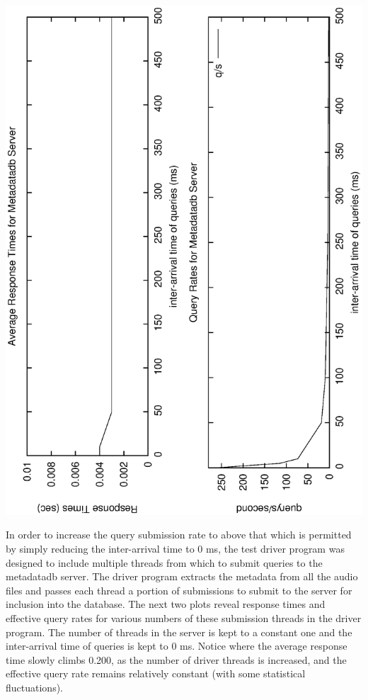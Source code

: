 \documentclass[11pt, a4paper]{article}
\begin{document}
\includegraphics[angle=-90,width=\linewidth]{mdperfthruput.eps}

In order to increase the query submission rate to above that which is permitted by simply 
reducing the inter-arrival time to 0 ms, the test driver program was designed to include multiple
threads from which to submit queries to the metadatadb server.  The driver program extracts the 
metadata from all the audio files and passes each thread a portion of submissions to submit to 
the server for inclusion into the database.  The next two plots reveal response times and
effective query rates for various numbers of these submission threads in the driver program. The
number of threads in the server is kept to a constant one and the inter-arrival time of queries is
kept to 0 ms.  Notice where the average response time slowly climbs 0.200, as the number of driver
threads is increased, and the effective query rate remains relatively constant (with some 
statistical fluctuations).
\end{document}

